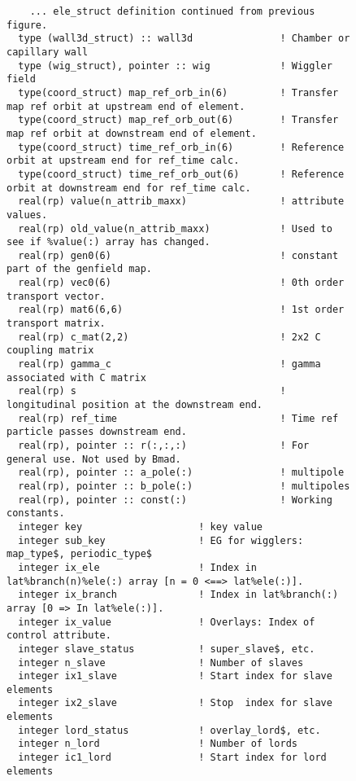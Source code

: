 
\begin{figure}[tb]
\centering
\footnotesize
\begin{verbatim}
    ... ele_struct definition continued from previous figure.
  type (wall3d_struct) :: wall3d               ! Chamber or capillary wall
  type (wig_struct), pointer :: wig            ! Wiggler field
  type(coord_struct) map_ref_orb_in(6)         ! Transfer map ref orbit at upstream end of element.
  type(coord_struct) map_ref_orb_out(6)        ! Transfer map ref orbit at downstream end of element.
  type(coord_struct) time_ref_orb_in(6)        ! Reference orbit at upstream end for ref_time calc.
  type(coord_struct) time_ref_orb_out(6)       ! Reference orbit at downstream end for ref_time calc.
  real(rp) value(n_attrib_maxx)                ! attribute values.
  real(rp) old_value(n_attrib_maxx)            ! Used to see if %value(:) array has changed.
  real(rp) gen0(6)                             ! constant part of the genfield map.
  real(rp) vec0(6)                             ! 0th order transport vector.
  real(rp) mat6(6,6)                           ! 1st order transport matrix.
  real(rp) c_mat(2,2)                          ! 2x2 C coupling matrix
  real(rp) gamma_c                             ! gamma associated with C matrix
  real(rp) s                                   ! longitudinal position at the downstream end.
  real(rp) ref_time                            ! Time ref particle passes downstream end.
  real(rp), pointer :: r(:,:,:)                ! For general use. Not used by Bmad.
  real(rp), pointer :: a_pole(:)               ! multipole
  real(rp), pointer :: b_pole(:)               ! multipoles
  real(rp), pointer :: const(:)                ! Working constants.
  integer key                    ! key value
  integer sub_key                ! EG for wigglers: map_type$, periodic_type$
  integer ix_ele                 ! Index in lat%branch(n)%ele(:) array [n = 0 <==> lat%ele(:)].
  integer ix_branch              ! Index in lat%branch(:) array [0 => In lat%ele(:)].
  integer ix_value               ! Overlays: Index of control attribute. 
  integer slave_status           ! super_slave$, etc.
  integer n_slave                ! Number of slaves
  integer ix1_slave              ! Start index for slave elements
  integer ix2_slave              ! Stop  index for slave elements
  integer lord_status            ! overlay_lord$, etc.
  integer n_lord                 ! Number of lords
  integer ic1_lord               ! Start index for lord elements

\end{verbatim}
\end{figure}
